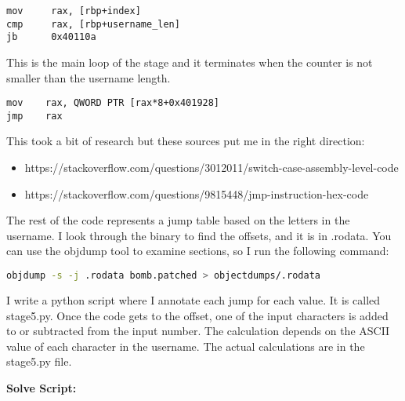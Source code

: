 \documentclass{article}
\begin{document}
\begin{lstlisting}
mov     rax, [rbp+index]
cmp     rax, [rbp+username_len]
jb      0x40110a
\end{lstlisting}
\par
This is the main loop of the stage and it terminates when the counter is 
not smaller than the username length.
\begin{lstlisting}
mov    rax, QWORD PTR [rax*8+0x401928]
jmp    rax
\end{lstlisting}
\par
This took a bit of research but these sources put me in the right direction:
\begin{itemize}
	\item https://stackoverflow.com/questions/3012011/switch-case-assembly-level-code
	\item https://stackoverflow.com/questions/9815448/jmp-instruction-hex-code
\end{itemize}
The rest of the code represents a jump table based on the letters in the 
username.  I look through the binary to find the offsets, and it is in 
.rodata.  You can use the objdump tool to examine sections, so I run the 
following command: 
\begin{lstlisting}[language=bash]
objdump -s -j .rodata bomb.patched > objectdumps/.rodata
\end{lstlisting}
I write a python script where I annotate each jump for each value.  It is 
called stage5.py.  Once the code gets to the offset, one of the input 
characters is added to or subtracted from the input number.  The calculation
depends on the ASCII value of each character in the username.  The actual 
calculations are in the stage5.py file.  

\begin{flushleft}
\textbf{Solve Script:}
\vspace{.5pc}
\end{flushleft}
\par
\end{document}
